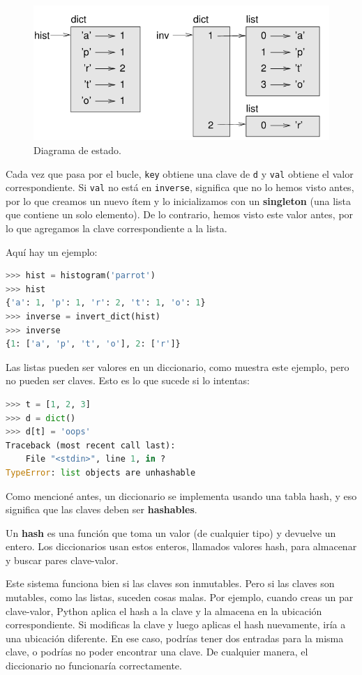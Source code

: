 \begin{figure}[h]
\centering
\includegraphics[width=0.7\linewidth]{images/chapter_11_1.png} %
\caption{Diagrama de estado.}
\label{fig:diagrama_estado}
\end{figure}

Cada vez que pasa por el bucle, \texttt{key} obtiene una clave de \texttt{d} y \texttt{val} obtiene el valor correspondiente. Si \texttt{val} no está en \texttt{inverse}, significa que no lo hemos visto antes, por lo que creamos un nuevo ítem y lo inicializamos con un \textbf{singleton} (una lista que contiene un solo elemento). De lo contrario, hemos visto este valor antes, por lo que agregamos la clave correspondiente a la lista.

Aquí hay un ejemplo:

\begin{lstlisting}[language=Python]
>>> hist = histogram('parrot')
>>> hist
{'a': 1, 'p': 1, 'r': 2, 't': 1, 'o': 1}
>>> inverse = invert_dict(hist)
>>> inverse
{1: ['a', 'p', 't', 'o'], 2: ['r']}
\end{lstlisting}

Las listas pueden ser valores en un diccionario, como muestra este ejemplo, pero no pueden ser claves. Esto es lo que sucede si lo intentas:

\begin{lstlisting}[language=Python]
>>> t = [1, 2, 3]
>>> d = dict()
>>> d[t] = 'oops'
Traceback (most recent call last):
    File "<stdin>", line 1, in ?
TypeError: list objects are unhashable
\end{lstlisting}

Como mencioné antes, un diccionario se implementa usando una tabla hash, y eso significa que las claves deben ser \textbf{hashables}.

Un \textbf{hash} es una función que toma un valor (de cualquier tipo) y devuelve un entero. Los diccionarios usan estos enteros, llamados valores hash, para almacenar y buscar pares clave-valor.

Este sistema funciona bien si las claves son inmutables. Pero si las claves son mutables, como las listas, suceden cosas malas. Por ejemplo, cuando creas un par clave-valor, Python aplica el hash a la clave y la almacena en la ubicación correspondiente. Si modificas la clave y luego aplicas el hash nuevamente, iría a una ubicación diferente. En ese caso, podrías tener dos entradas para la misma clave, o podrías no poder encontrar una clave. De cualquier manera, el diccionario no funcionaría correctamente.

